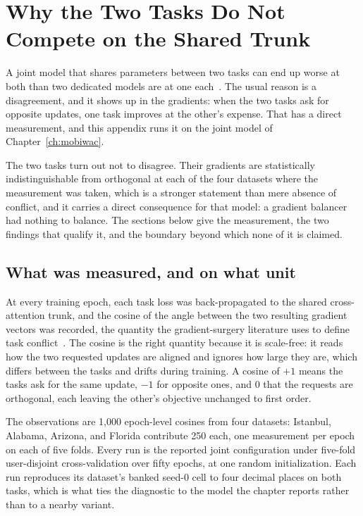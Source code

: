 
\chapter{Why the Two Tasks Do Not Compete on the Shared Trunk}
\label{apx:cosine}

A joint model that shares parameters between two tasks can end up worse at both than two dedicated
models are at one each~\cite{standley2020tasks}.
The usual reason is a disagreement, and it shows up in the gradients: when the
two tasks ask for opposite updates, one task improves at the other's expense. That has a direct measurement, and this appendix runs it on the joint model of
Chapter~\ref{ch:mobiwac}.

The two tasks turn out not to disagree. Their gradients are statistically indistinguishable from
orthogonal at each of the four datasets where the measurement was taken, which is a stronger statement than mere absence of
conflict, and it carries a direct consequence for that model: a gradient balancer had nothing
to balance. The sections below give the
measurement, the two findings that qualify it, and the boundary beyond which none of it is claimed.

\section{What was measured, and on what unit}
\label{apx:cosine:setup}

At every training epoch, each task loss was back-propagated to the shared cross-attention trunk, and
the cosine of the angle between the two resulting gradient vectors was recorded, the quantity the
gradient-surgery literature uses to define task conflict~\cite{yu2020pcgrad}. The cosine is the
right quantity because it is scale-free: it reads how the two requested updates are aligned and
ignores how large they are, which differs between the tasks and drifts during training. A cosine of
$+1$ means the tasks ask for the same update, $-1$ for opposite ones, and $0$ that the requests are
orthogonal, each leaving the other's objective unchanged to first order.

The observations are 1,000 epoch-level cosines from four datasets: Istanbul, Alabama, Arizona, and
Florida contribute 250 each, one measurement per epoch on each of five folds. Every run is the
reported joint configuration under five-fold user-disjoint cross-validation over fifty epochs, at
one random initialization. Each run reproduces its dataset's banked seed-0 cell to four decimal
places on both tasks, which is what ties the
diagnostic to the model the chapter reports rather than to a nearby variant.

